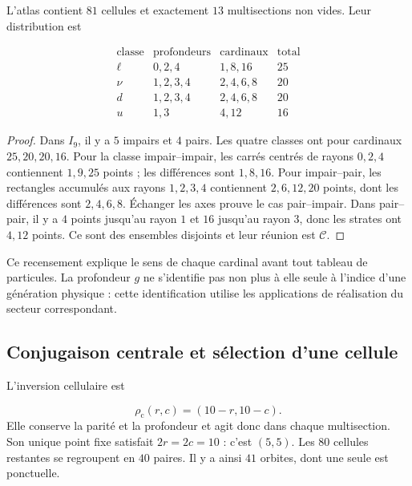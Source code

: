 \begin{proposition}
\label{vi:prop:censo13}
L’atlas contient \(81\) cellules et exactement \(13\) multisections non vides.
Leur distribution est

\[
\begin{array}{c|c|c|r}
\text{classe}&\text{profondeurs}&\text{cardinaux}&\text{total}\\\hline
\ell&0,2,4&1,8,16&25\\
\nu&1,2,3,4&2,4,6,8&20\\
d&1,2,3,4&2,4,6,8&20\\
u&1,3&4,12&16
\end{array}
\]
\end{proposition}
\begin{proof}
Dans \(I_9\), il y a \(5\) impairs et \(4\) pairs. Les quatre classes ont pour
cardinaux \(25,20,20,16\). Pour la classe impair--impair, les carrés
centrés de rayons \(0,2,4\) contiennent \(1,9,25\) points ; les
différences sont \(1,8,16\). Pour impair--pair, les rectangles accumulés
aux rayons \(1,2,3,4\) contiennent \(2,6,12,20\) points, dont les
différences sont \(2,4,6,8\). Échanger les axes prouve le cas
pair--impair. Dans pair--pair, il y a \(4\) points jusqu’au rayon \(1\) et \(16\)
jusqu’au rayon \(3\), donc les strates ont \(4,12\) points.
Ce sont des ensembles disjoints et leur réunion est \(\mathcal C\).

\end{proof}

Ce recensement explique le sens de chaque cardinal avant tout tableau
de particules. La profondeur \(g\) ne s’identifie pas non plus à elle seule à
l’indice d’une génération physique : cette identification utilise les applications
de réalisation du secteur correspondant.


\subsection{Conjugaison centrale et sélection d’une cellule
}

L’inversion cellulaire est

\[
 \rho_{\mathrm c}(r,c)=(10-r,10-c).
\]
Elle conserve la parité et la profondeur et agit donc dans chaque
multisection. Son unique point fixe satisfait \(2r=2c=10\) : c’est \((5,5)\).
Les \(80\) cellules restantes se regroupent en \(40\) paires. Il y a ainsi
\(41\) orbites, dont une seule est ponctuelle.


